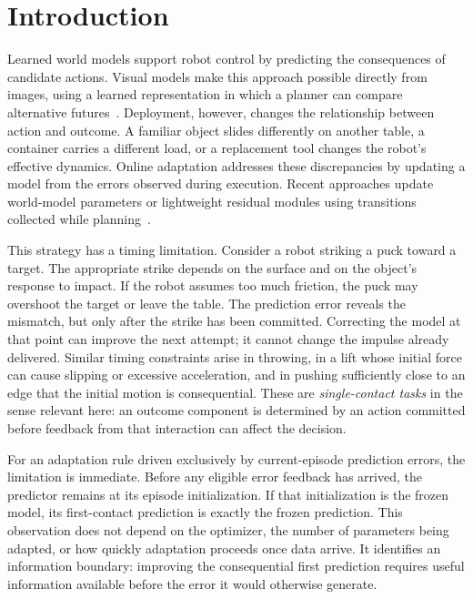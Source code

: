 \section{Introduction}
Learned world models support robot control by predicting the consequences of candidate actions. Visual models make this approach possible directly from images, using a learned representation in which a planner can compare alternative futures~\cite{zhou2025dinowm}. Deployment, however, changes the relationship between action and outcome. A familiar object slides differently on another table, a container carries a different load, or a replacement tool changes the robot's effective dynamics. Online adaptation addresses these discrepancies by updating a model from the errors observed during execution. Recent approaches update world-model parameters or lightweight residual modules using transitions collected while planning~\cite{wang2026adajepa,soni2026sandwich}.

This strategy has a timing limitation. Consider a robot striking a puck toward a target. The appropriate strike depends on the surface and on the object's response to impact. If the robot assumes too much friction, the puck may overshoot the target or leave the table. The prediction error reveals the mismatch, but only after the strike has been committed. Correcting the model at that point can improve the next attempt; it cannot change the impulse already delivered. Similar timing constraints arise in throwing, in a lift whose initial force can cause slipping or excessive acceleration, and in pushing sufficiently close to an edge that the initial motion is consequential. These are \emph{single-contact tasks} in the sense relevant here: an outcome component is determined by an action committed before feedback from that interaction can affect the decision.

For an adaptation rule driven exclusively by current-episode prediction errors, the limitation is immediate. Before any eligible error feedback has arrived, the predictor remains at its episode initialization. If that initialization is the frozen model, its first-contact prediction is exactly the frozen prediction. This observation does not depend on the optimizer, the number of parameters being adapted, or how quickly adaptation proceeds once data arrive. It identifies an information boundary: improving the consequential first prediction requires useful information available before the error it would otherwise generate.


